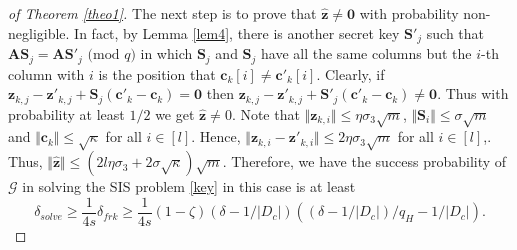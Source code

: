 \documentclass[runningheads]{llncs}
\begin{document}
\begin{proof}[of Theorem \ref{theo1}]
	The next step is to prove that $\widehat{\mathbf{z}} \neq \mathbf{0}$ with probability non- negligible. In fact, by Lemma \ref{lem4}, there is another secret key $\mathbf{S'}_{j}$ such that $\mathbf{A}\mathbf{S}_{j}=\mathbf{A}\mathbf{S}'_{j} \text{ (mod } q)$ in which $\mathbf{S}_{j}$ and $\mathbf{S}_{j}$ have all the same columns but the $i$-th column with $i$ is the position that $\mathbf{c}_k[i] \neq \mathbf{c}'_k[i]$. Clearly, if $\mathbf{z}_{k,j}-\mathbf{z}'_{k,j}+\mathbf{S}_{j}(\mathbf{c}'_k-\mathbf{c}_k)=\mathbf{0}$ then $\mathbf{z}_{k,j}-\mathbf{z}'_{k,j}+\mathbf{S}'_{j}(\mathbf{c}'_k-\mathbf{c}_k) \neq \mathbf{0}$. Thus with probability at least $1/2$ we get $\widehat{\mathbf{z}}\neq 0$. Note that $\Vert \mathbf{z}_{k,i}\Vert\leq \eta\sigma_3\sqrt{m}$, $\Vert \mathbf{S}_{i}\Vert\leq \sigma\sqrt{m}$ and $\Vert \mathbf{c}_{k}\Vert\leq \sqrt{\kappa}$ for all $i \in [l]$. Hence, $\Vert \mathbf{z}_{k,i}-\mathbf{z'}_{k,i}\Vert\leq 2\eta\sigma_3\sqrt{m}$ for all $i \in [l]$,. Thus, $\Vert \widehat{\mathbf{z}}\Vert \leq (2l\eta\sigma_3+2\sigma\sqrt{\kappa})\sqrt{m}$.
	Therefore, we have the success probability of $\mathcal{G}$ in solving the \textsf{SIS} problem \eqref{key} in this case is at least $$\delta_{solve} \geq \frac{1}{4s}\delta_{frk} \geq \frac{1}{4s}(1-\zeta) (\delta-1/|D_c|)((\delta-1/|D_c|)/q_H-1/|D_c|).$$
	

\end{proof}
\end{document}
